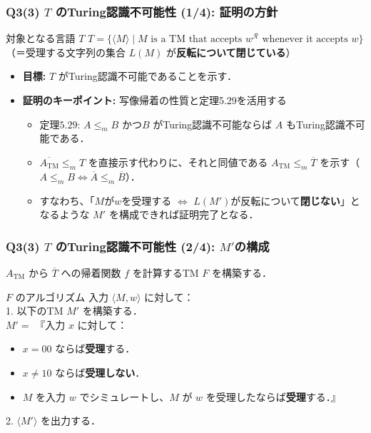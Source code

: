 \begin{frame}[fragile]
\frametitle{Q3(3) $T$ のTuring認識不可能性 (1/4): 証明の方針}
\begin{block}{対象となる言語 $T$}
  $T = \{\langle M \rangle \mid M \text{ is a TM that accepts } w^\mathcal{R} \text{ whenever it accepts } w\}$
  （＝受理する文字列の集合 $L(M)$ が\textbf{反転について閉じている}）
\end{block}

\begin{itemize}
  \item \textbf{目標:} $T$ がTuring認識不可能であることを示す．
  \item \textbf{証明のキーポイント:} \alert{写像帰着の性質と定理5.29を活用する}
  \begin{itemize}
      \item 定理$5.29$:  $A \le_m B$ かつ$B$ がTuring認識不可能ならば $A$ もTuring認識不可能である．
      \item $\overline{A_{\mathrm{TM}}} \le_m T$ を直接示す代わりに、それと同値である \textbf{$A_{\mathrm{TM}} \le_m \overline{T}$} を示す（$A \le_m B \iff \overline{A} \le_m \overline{B}$）．
      \item すなわち、「$M$が$w$を受理する $\iff$ $L(M')$が反転について\textbf{閉じない}」となるような $M'$ を構成できれば証明完了となる．
  \end{itemize}
\end{itemize}
\end{frame}

\begin{frame}[fragile]
\frametitle{Q3(3) $T$ のTuring認識不可能性 (2/4): $M'$の構成}
$A_{\mathrm{TM}}$ から $\overline{T}$ への帰着関数 $f$ を計算するTM $F$ を構築する．

\begin{block}{$F$ のアルゴリズム}
  入力 $\langle M, w \rangle$ に対して：\\
  1. 以下のTM $M'$ を構築する．\\
  \quad $M'=$ 『入力 $x$ に対して：
  \begin{itemize}
      \item $x = 00$ ならば\textbf{受理}する．
      \item $x \neq 10$ ならば\textbf{受理しない}．
      \item $M$ を入力 $w$ でシミュレートし、$M$ が $w$ を受理したならば\textbf{受理}する．』
  \end{itemize}
  2. $\langle M' \rangle$ を出力する．
\end{block}
\end{frame}

